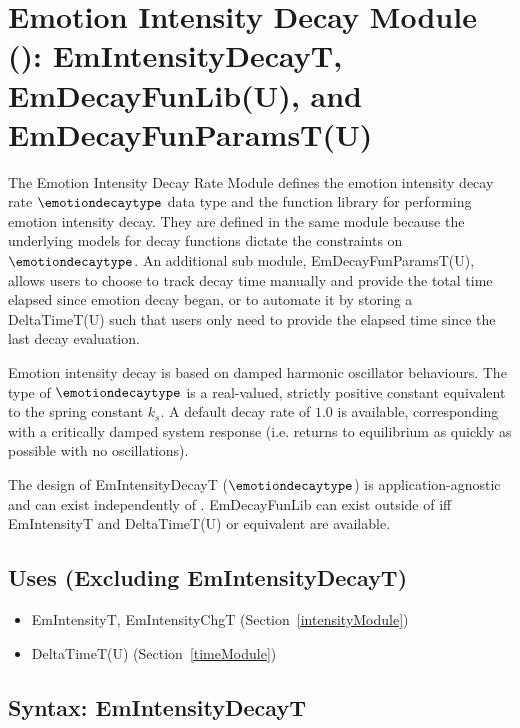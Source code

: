 \section[Emotion Intensity Decay Module (\mref{mDecay}): EmIntensityDecayT,
EmDecayFunLib(U), and EmDecayFunParamsT(U)]{Emotion Intensity Decay Module
(): EmIntensityDecayT, \\ EmDecayFunLib(U), and
EmDecayFunParamsT(U)}\label{decayModule}

The Emotion Intensity Decay Rate Module defines the emotion intensity decay rate
$\emotiondecaytype$ data type and the function library for performing emotion
intensity decay. They are defined in the same module because the underlying
models for decay functions dictate the constraints on $\emotiondecaytype$. An
additional sub module, EmDecayFunParamsT(U), allows users to choose to track
decay time manually and provide the total time elapsed since emotion decay
began, or to automate it by storing a DeltaTimeT(U) such that users only need
to provide the elapsed time since the last decay evaluation.

Emotion intensity decay is based on damped harmonic oscillator behaviours. The
type of $\emotiondecaytype$ is a real-valued, strictly positive constant
equivalent to the spring constant $k_s$. A default decay rate of $1.0$ is
available, corresponding with a critically damped system response (i.e. returns
to equilibrium as quickly as possible with no oscillations).

The design of EmIntensityDecayT ($\emotiondecaytype$) is application-agnostic
and can exist independently of \progname{}. EmDecayFunLib can exist outside of
\progname{} iff EmIntensityT and DeltaTimeT(U) or equivalent are available.

\subsection{Uses (Excluding EmIntensityDecayT)}
\begin{itemize}[noitemsep, nosep]

    \item EmIntensityT, EmIntensityChgT (Section~\ref{intensityModule})

    \item DeltaTimeT(U) (Section~\ref{timeModule})

\end{itemize}

\subsection{Syntax: EmIntensityDecayT}


